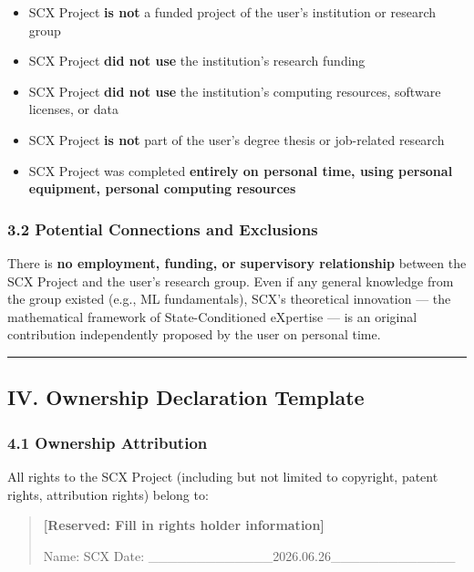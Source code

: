 \documentclass[
  12pt,
]{article}
\providecommand{\tightlist}{%
  \setlength{\itemsep}{0pt}\setlength{\parskip}{0pt}}
\begin{document}
\begin{itemize}
\tightlist
\item
  SCX Project \textbf{is not} a funded project of the user's institution or research group
\item
  SCX Project \textbf{did not use} the institution's research funding
\item
  SCX Project \textbf{did not use} the institution's computing resources, software licenses, or data
\item
  SCX Project \textbf{is not} part of the user's degree thesis or job-related research
\item
  SCX Project was completed \textbf{entirely on personal time, using personal equipment, personal computing resources}
\end{itemize}

\subsubsection{3.2 Potential Connections and Exclusions}\label{potential-connections-and-exclusions}

There is \textbf{no employment, funding, or supervisory relationship} between the SCX Project and the user's research group. Even if any general knowledge from the group existed (e.g., ML fundamentals), SCX's theoretical innovation --- the mathematical framework of State-Conditioned eXpertise --- is an original contribution independently proposed by the user on personal time.

\begin{center}\rule{0.5\linewidth}{0.5pt}\end{center}

\subsection{IV. Ownership Declaration Template}\label{iv-ownership-declaration-template}

\subsubsection{4.1 Ownership Attribution}\label{ownership-attribution}

All rights to the SCX Project (including but not limited to copyright, patent rights, attribution rights) belong to:

\begin{quote}
\textbf{[Reserved: Fill in rights holder information]}

Name: SCX
Date: \_\_\_\_\_\_\_\_\_\_\_\_\_2026.06.26\_\_\_\_\_\_\_\_\_\_\_\_\_
\end{quote}
\end{document}
